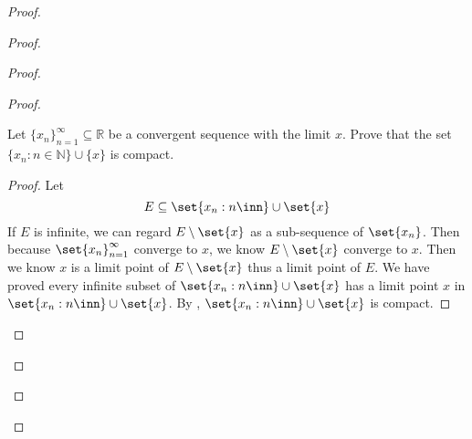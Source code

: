 \documentclass{report}
\begin{document}
\begin{proof}
\begin{proof}
\begin{proof}
\begin{proof}
\begin{question}{}{}
Let \( \{ x_n \}_{n=1}^{\infty} \subseteq \mathbb{R} \) be a convergent sequence with the limit \( x \). Prove that the set \( \{ x_n : n \in \mathbb{N} \} \cup \{ x \} \) is compact.
\end{question}
\begin{proof}
Let 
\begin{equation*}
E\subseteq \set{x_n:n\inn}\cup \set{x}
\end{equation*}
If $E$ is infinite, we can regard  $E\setminus \set{x}$ as a sub-sequence of $\set{x_n}$. Then because $\set{x_n}_{n=1}^\infty$ converge to $x$, we know  $E\setminus \set{x}$ converge to $x$. Then we know $x$ is a limit point of $E\setminus \set{x}$ thus a limit point of $E$. We have proved every infinite subset of $\set{x_n:n\inn}\cup \set{x}$ has a limit point $x$ in $\set{x_n:n\inn}\cup \set{x}$. By , $\set{x_n:n\inn}\cup \set{x}$ is compact.
\end{proof}
\begin{question}{}{}


\end{question}
\end{proof}
\end{proof}
\end{proof}
\end{proof}
\end{document}
